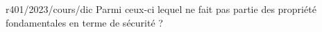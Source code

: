\begin{question}{r401/2023/cours/dic}
  Parmi ceux-ci lequel ne fait pas partie des propriété fondamentales
  en terme de sécurité ?
  \begin{reponseshoriz}
  \end{reponseshoriz}
\end{question}
